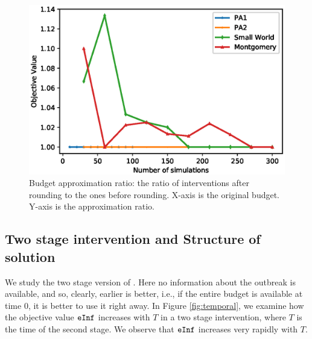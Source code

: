 \begin{figure}[!h]
    \centering
    \includegraphics[scale = 0.52]{Figuresnew/budgetviolation}
    \caption{Budget approximation ratio: the ratio of interventions after rounding to the ones before rounding. X-axis is the original budget. Y-axis is the approximation ratio.}
    \label{fig:budgetviolation}
\end{figure}

\subsection{Two stage intervention and Structure of solution}
We study the two stage version of \prob{}. Here no information about the outbreak is available, and so, clearly, earlier is better, i.e., if the entire budget is available at time $0$, it is better to use it right away. In Figure \ref{fig:temporal}, we examine how the objective value $\texttt{eInf}{}$ increases with $T$ in a two stage intervention, where $T$ is the time of the second stage. We observe that $\texttt{eInf}{}$ increases very rapidly with $T$.

